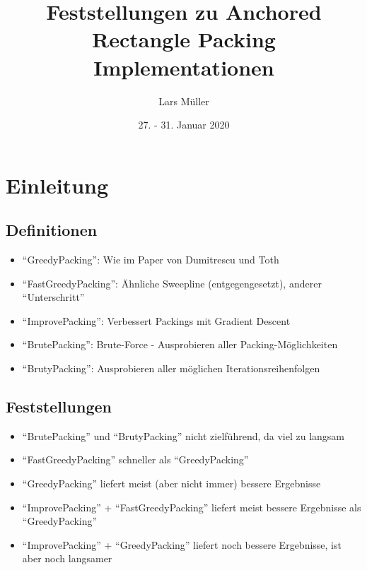 \documentclass{article}
\title{Feststellungen zu Anchored Rectangle Packing Implementationen}
\author{Lars Müller}
\date{27. - 31. Januar 2020}
\begin{document}
\maketitle
\tableofcontents
\section{Einleitung}


\subsection{Definitionen}

\begin{itemize}
    \item ``GreedyPacking'': Wie im Paper von Dumitrescu und Toth
    \item ``FastGreedyPacking'': Ähnliche Sweepline (entgegengesetzt), anderer ``Unterschritt''
    \item ``ImprovePacking'': Verbessert Packings mit Gradient Descent
    \item ``BrutePacking'': Brute-Force - Ausprobieren aller Packing-Möglichkeiten
    \item ``BrutyPacking'': Ausprobieren aller möglichen Iterationsreihenfolgen
\end{itemize}

\subsection{Feststellungen}

\begin{itemize}
    \item ``BrutePacking'' und ``BrutyPacking'' nicht zielführend, da viel zu langsam
    \item ``FastGreedyPacking'' schneller als ``GreedyPacking''
    \item ``GreedyPacking'' liefert meist (aber nicht immer) bessere Ergebnisse
    \item ``ImprovePacking'' + ``FastGreedyPacking'' liefert meist bessere Ergebnisse als ``GreedyPacking''
    \item ``ImprovePacking'' + ``GreedyPacking'' liefert noch bessere Ergebnisse, ist aber noch langsamer
\end{itemize}
\end{document}
